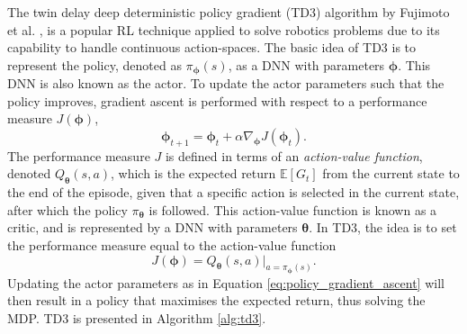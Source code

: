 The twin delay deep deterministic policy gradient (TD3) algorithm by Fujimoto et al. \cite{Fujimoto2018}, is a popular RL technique applied to solve robotics problems due to its capability to handle continuous action-spaces.
The basic idea of TD3 is to represent the policy, denoted as $\pi_{\bm{\phi}}(s)$, as a DNN with parameters $\bm{\phi}$.
This DNN is also known as the actor.
To update the actor parameters such that the policy improves, gradient ascent is performed with respect to a performance measure $J(\bm{\phi})$,
\begin{equation}\label{eq:policy_gradient_ascent}
    \bm{\phi}_{t+1} = \bm{\phi}_{t} + \alpha \nabla_{\bm{\phi}} J(\bm{\phi}_t).
\end{equation}
The performance measure $J$ is defined in terms of an \emph{action-value function}, denoted $Q_{\bm{\theta}}(s,a)$, which is the expected return $\mathbb{E}[G_t]$ from the current state to the end of the episode, given that a specific action is selected in the current state, after which the policy $\pi_{\bm{\theta}}$ is followed.
This action-value function is known as a critic, and is represented by a DNN with parameters $\bm{\theta}$.
In TD3, the idea is to set the performance measure equal to the action-value function
\begin{equation}
    J(\bm{\phi}) = Q_{\bm{\theta}}(s,a)| _{a=\pi_{\bm{\phi}}(s)}.
\end{equation}
Updating the actor parameters as in Equation \ref{eq:policy_gradient_ascent} will then result in a policy that maximises the expected return, thus solving the MDP. 
TD3 is presented in Algorithm \ref{alg:td3}.


